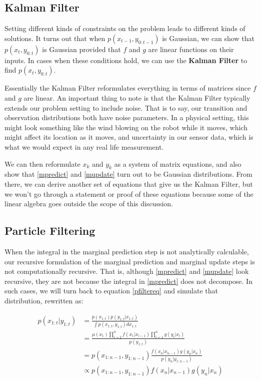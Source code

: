 \documentclass{article}
\begin{document}
\subsection{Kalman Filter} \label{sec:kalman}

Setting different kinds of constraints on the problem leads to different kinds of solutions. It turns out that when $p(x_{t-1},y_{0:t-1})$ is Gaussian, we can show that $p(x_{t},y_{0:t})$ is Gaussian provided that $f$ and $g$ are linear functions on their inputs. In cases when these conditions hold, we can use the \textbf{Kalman Filter} to find $p(x_{t},y_{0:t})$.

Essentially the Kalman Filter reformulates everything in terms of matrices since $f$ and $g$ are linear. An important thing to note is that the Kalman Filter typically extends our problem setting to include noise. That is to say, our transition and observation distributions both have noise parameters. In a physical setting, this might look something like the wind blowing on the robot while it moves, which might affect its location as it moves, and uncertainty in our sensor data, which is what we would expect in any real life measurement.

We can then reformulate $x_k$ and $y_k$ as a system of matrix equations, and also show that \eqref{mpredict} and \eqref{mupdate} turn out to be Gaussian distributions. From there, we can derive another set of equations that give us the Kalman Filter, but we won't go through a statement or proof of these equations because some of the linear algebra goes outside the scope of this discussion.

\subsection{Particle Filtering} \label{sec:pfiltering}
When the integral in the marginal prediction step is not analytically calculable, our recursive formulation of the marginal prediction and marginal update steps is not computationally recursive. That is, although \eqref{mpredict} and \eqref{mupdate} look recursive, they are not because the integral in \eqref{mpredict} does not decompose. In such cases, we will turn back to equation \eqref{pfiltereq} and simulate that distribution, rewritten as:

\begin{equation}
\begin{split}
p(x_{1:t}|y_{1:t}) &= \frac{p(x_{1:t}) p(y_{1:t}|x_{1:t})}{\int p(x_{1:t},y_{1:t}) dx_{1:t}}\\
&= \frac{\mu(x_1)\prod_{i=2}^{n} f(x_1|x_{i-1})\prod_{i=1}^{n} g(y_i|x_i)}{p(y_{1:t})} \\
&= p(x_{1:n-1},y_{1:n-1}) \frac{f(x_n|x_{n-1})g(y_n|x_n)}{p(y_n|y_{1:n-1})} \\
&\propto p(x_{1:n-1},y_{1:n-1}) f(x_n|x_{n-1})g(y_n|x_n)
\end{split}
\end{equation}
\end{document}
